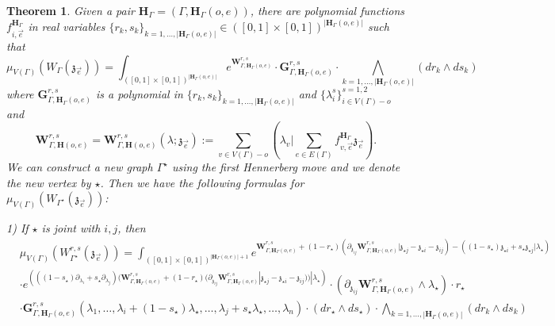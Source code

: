 \documentclass[11pt]{amsart}
\newtheorem{thm}{Theorem}[section]
\theoremstyle{definition}
\theoremstyle{remark}
\numberwithin{equation}{section}
\begin{document}
\begin{thm}\label{MainTheoremRecursiveRS}
Given a pair $\mathbf{H}_{\Gamma}=(\Gamma,\mathbf{H}_{\Gamma}(o,e))$, there are polynomial functions $f^{\mathbf{H}_{\Gamma}}_{i,\vec{e}}$ in real variables $\{r_k,s_k\}_{k=1,\dots,|\mathbf{H}_{\Gamma}(o,e)|}\in ([0,1]\times[0,1])^{|\mathbf{H}_{\Gamma}(o,e)|}$ such that
$$
\mu_{V(\Gamma)}\left(W_{\Gamma}(\mathfrak{z}_{\vec{e}})\right)=\int_{([0,1]\times[0,1])^{|\mathbf{H}_{\Gamma}(o,e)|}}e^{\mathbf{W}^{r,s}_{\Gamma,\mathbf{H}_{\Gamma}(o,e)}}\cdot \mathbf{G}^{r,s}_{\Gamma,\mathbf{H}_{\Gamma}(o,e)}\cdot \bigwedge_{k=1,\dots,|\mathbf{H}_{\Gamma}(o,e)|} (dr_k\wedge ds_k)
$$
where $\mathbf{G}^{r,s}_{\Gamma,\mathbf{H}_{\Gamma}(o,e)}$ is a polynomial in $\{r_k,s_k\}_{k=1,\dots,|\mathbf{H}_{\Gamma}(o,e)|}$ and $\{\lambda^s_i\}^{s=1,2}_{i\in V(\Gamma)-o}$ and
$$
    \mathbf{W}^{r,s}_{\Gamma,\mathbf{H}(o,e)}=\mathbf{W}^{r,s}_{\Gamma,\mathbf{H}(o,e)}(\lambda;\mathfrak{z}_{\vec{e}}):=\sum_{v\in V(\Gamma)-o}(\lambda_v|\sum_{e\in E(\Gamma)}f^{\mathbf{H}_{\Gamma}}_{v,\vec{e}}\mathfrak{z}_{\vec{e}}).
$$
We can construct a new graph $\Gamma^{\star}$ using the first Hennerberg move and we denote the new vertex by $\star$. Then we have the following formulas for $\mu_{V(\Gamma)}\left(W_{\Gamma^{\star}}(\mathfrak{z}_{\vec{e}})\right)$:

  1) If $\star$ is joint with $i,j$, then
\begin{align*}
& \mu_{V(\Gamma)}\left(W^{r,s}_{\Gamma^{\star}}(\mathfrak{z}_{\vec{e}})\right)  = \int_{([0,1]\times[0,1])^{|\mathbf{H}_{\Gamma}(o,e)|+1}} e^{\mathbf{W}^{r,s}_{\Gamma,\mathbf{H}_{\Gamma}(o,e)}+(1-r_{\star})\left(\partial_{\mathfrak{z}_{ij}}\mathbf{W}^{r,s}_{\Gamma,\mathbf{H}_{\Gamma}(o,e)}|\mathfrak{z}_{\star j}-\mathfrak{z}_{\star i}-\mathfrak{z}_{ij}\right)-\left((1-s_{\star})\mathfrak{z}_{\star i}+s_{\star}\mathfrak{z}_{\star j}|\lambda_{\star}\right)} \\
   & \cdot e^{\left(((1-s_{\star})\partial_{\lambda_i}+s_{\star}\partial_{\lambda_j})(\mathbf{W}^{r,s}_{\Gamma,\mathbf{H}_{\Gamma}(o,e)}+(1-r_{\star})(\partial_{\mathfrak{z}_{ij}}\mathbf{W}^{r,s}_{\Gamma,\mathbf{H}_{\Gamma}(o,e)}|\mathfrak{z}_{\star j}-\mathfrak{z}_{\star i}-\mathfrak{z}_{ij}))|\lambda_{\star}\right)}\cdot \left(\partial_{\mathfrak{z}_{ij}}\mathbf{W}^{r,s}_{\Gamma,\mathbf{H}_{\Gamma}(o,e)}\wedge\lambda_{\star}\right)\cdot r_{\star}\\
   &\cdot  \mathbf{G}^{r,s}_{\Gamma,\mathbf{H}_{\Gamma}(o,e)}(\lambda_1,\dots,\lambda_i+(1-s_{\star})\lambda_{\star},\dots,\lambda_j+s_{\star}\lambda_{\star},\dots,\lambda_{n})\cdot (dr_{\star}\wedge ds_{\star})\cdot \bigwedge_{k=1,\dots,|\mathbf{H}_{\Gamma}(o,e)|} (dr_k\wedge ds_k)
\end{align*}


\end{thm}
\end{document}

